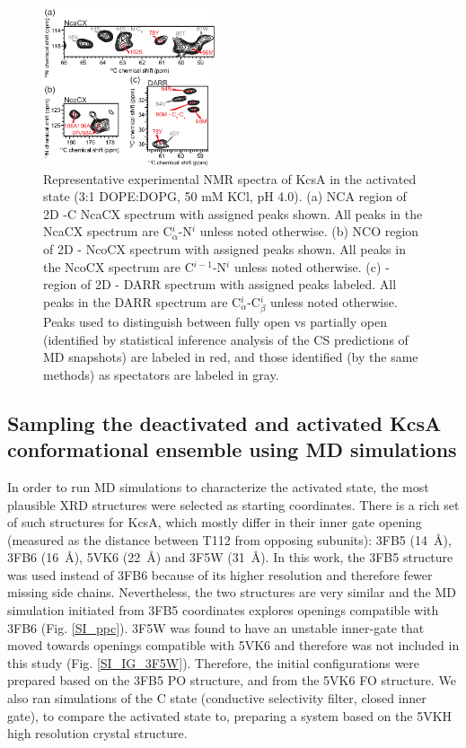 \documentclass[%
 aip,
 amsmath,amssymb,
 preprint,%
]{revtex4-1}
\newcommand{\ca}{\ce{C_\alpha} }
\newcommand{\cb}{\ce{C_\beta} }
\begin{document}
\begin{figure}[tbp]
	\includegraphics[width=0.45\textwidth]{figures/KcsA_NCA_markers_v2.eps}
	 \caption{\label{fg:NMR_2D_markers}\scriptsize
    Representative experimental NMR spectra of KcsA in the activated state (3:1 DOPE:DOPG, 50 mM KCl, pH 4.0). (a) NCA region of 2D -C NcaCX spectrum with assigned peaks shown. All peaks in the NcaCX spectrum are C$_{\alpha}^i$-N$^i$ unless noted otherwise. (b) NCO region of 2D - NcoCX spectrum with assigned peaks shown. All peaks in the NcoCX spectrum are C$^{i-1}$-N$^i$ unless noted otherwise. (c) \ca-\cb region of 2D - DARR spectrum with assigned peaks labeled. All peaks in the DARR spectrum are C$_{\alpha}^{i}$-C$_{\beta}^{i}$ unless noted otherwise. Peaks used to distinguish between fully open vs partially open (identified by statistical inference analysis of the CS predictions of MD snapshots) are labeled in red, and those identified (by the same methods) as spectators are labeled in gray.}
\end{figure}

\subsection{Sampling the deactivated and activated KcsA conformational ensemble using MD simulations}

In order to run MD simulations to characterize the activated state, the most plausible XRD structures were selected as starting coordinates. There is a rich set of such structures for KcsA, which mostly differ in their inner gate opening (measured as the distance between T112 \ca from opposing subunits): 3FB5 (\SI{14}{\angstrom}), 3FB6 (\SI{16}{\angstrom}), 5VK6 (\SI{22}{\angstrom}) and 3F5W (\SI{31}{\angstrom})\cite{Cuello2010,Cuello2017}. In this work, the 3FB5 structure was used instead of 3FB6 because of its higher resolution and therefore fewer missing side chains. Nevertheless, the two structures are very similar and the MD simulation initiated from 3FB5 coordinates explores  openings compatible with 3FB6 (Fig. \ref{SI_ppc}). 3F5W was found to have an unstable inner-gate that moved towards openings compatible with 5VK6 and therefore was not included in this study (Fig. \ref{SI_IG_3F5W}). Therefore, the initial configurations were prepared based on the 3FB5 PO structure, and from the 5VK6 FO structure. We also ran simulations of the C state (conductive selectivity filter, closed inner gate), to compare the activated state to, preparing a system based on the 5VKH high resolution crystal structure. 
\end{document}
